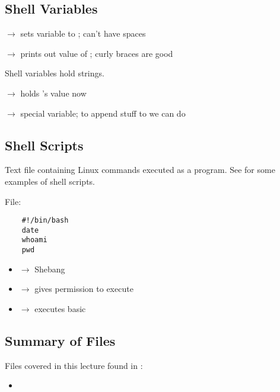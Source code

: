 \subsection{Shell Variables}
 $ \rightarrow $ sets variable  to ; can't have spaces

 $ \rightarrow $ prints out value of ; curly braces are good

Shell variables hold strings.

 $ \rightarrow $  holds 's value now

 $ \rightarrow $ special variable; to append stuff to
 we can do 

\subsection{Shell Scripts}
Text file containing Linux commands executed as a program. See
 for some examples of shell scripts.

File: 
\begin{lstlisting}
    #!/bin/bash
    date
    whoami
    pwd
\end{lstlisting}
\begin{itemize}
    \item \code{\#!} $ \rightarrow $ Shebang
    \item {} $ \rightarrow $ gives permission to execute 
    \item {} $ \rightarrow $ executes basic
\end{itemize}

\subsection{Summary of Files}
Files covered in this lecture found in :
\begin{itemize}
    \item {}
\end{itemize}
